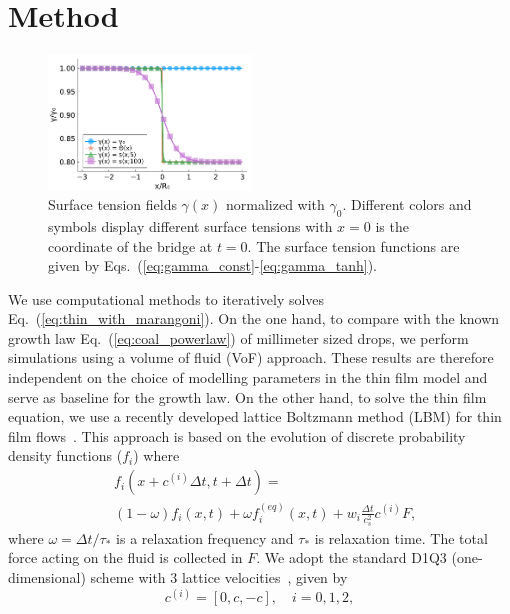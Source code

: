 \documentclass[twocolumn,amsmath,amssymb,showpacs,pre,nofootinbib,superscriptaddress]{revtex4-1} %
\begin{document}
\section{Method}\label{sec:method}
\begin{figure}
    \centering
    \includegraphics[width=0.48\textwidth]{Figures/gammas.pdf}
    \caption{Surface tension fields $\gamma(x)$ normalized with $\gamma_0$.
    Different colors and symbols display different surface tensions with $x=0$ is the coordinate of the bridge at $t=0$.
    The surface tension functions are given by Eqs.~(\ref{eq:gamma_const}-\ref{eq:gamma_tanh}).
    }
    \label{fig:gammas}
\end{figure}
We use computational methods to iteratively solves Eq.~(\ref{eq:thin_with_marangoni}).
On the one hand, to compare with the known growth law Eq.~(\ref{eq:coal_powerlaw}) of millimeter sized drops, we perform simulations using a volume of fluid (VoF) approach.
These results are therefore independent on the choice of modelling parameters in the thin film model and serve as baseline for the growth law. 
On the other hand, to solve the thin film equation, we use a recently developed lattice Boltzmann method (LBM) for thin film flows~\cite{PhysRevE.100.033313, PhysRevE.104.034801}.
This approach is based on the evolution of discrete probability density functions ($f_i$) where
\begin{equation}\label{eq:LBE}
    \begin{split}
        &f_i(x+c^{(i)}\Delta t,t+\Delta t) = \\
        &\left(1 - \omega\right) f_i(x,t) + \omega f_i^{(eq)}(x,t) + w_i \frac{\Delta t}{c_s^2} c^{(i)} F,
    \end{split}
\end{equation}
where $\omega = \Delta t/\tau_{\ast}$ is a relaxation frequency and $\tau_{\ast}$ is relaxation time. 
The total force acting on the fluid is collected in $F$.
We adopt the standard D1Q3 (one-dimensional) scheme with $3$ lattice velocities~\cite{krueger2017}, given by
\begin{equation}\label{eq:speeds}
c^{(i)}  = [0, c, -c], \quad i = 0, 1, 2,
\end{equation}
\end{document}
